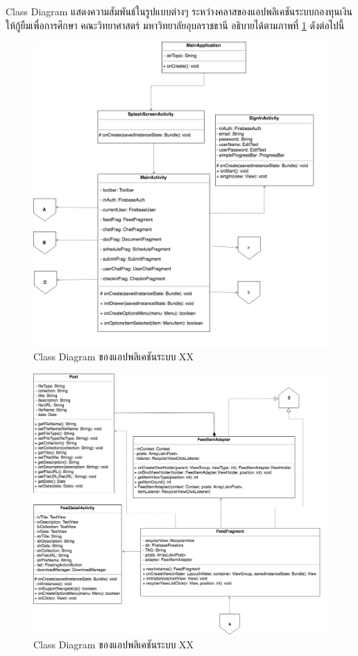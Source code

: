 \newpage
	Class Diagram แสดงความสัมพันธ์ในรูปแบบต่างๆ ระหว่างคลาสของแอปพลิเคชันระบบกองทุนเงินให้กู้ยืมเพื่อการศึกษา คณะวิทยาศาสตร์ มหาวิทยาลัยอุบลราชธานี อธิบายได้ตามภาพที่ \ref{Fig:MainActivity20C} ดังต่อไปนี้
	\begin{figure}[H]
		\includegraphics[width=1.0\columnwidth]{Figures/3/Class/MainActivity}
		\caption{Class Diagram ของแอปพลิเคชันระบบ XX}
		\label{Fig:MainActivity20C}
	\end{figure}
	\begin{figure}[H]
		\includegraphics[width=1.0\columnwidth]{Figures/3/Class/Feed}
		\caption{Class Diagram ของแอปพลิเคชันระบบ XX}
		\label{Fig:FeedC}
	\end{figure}
